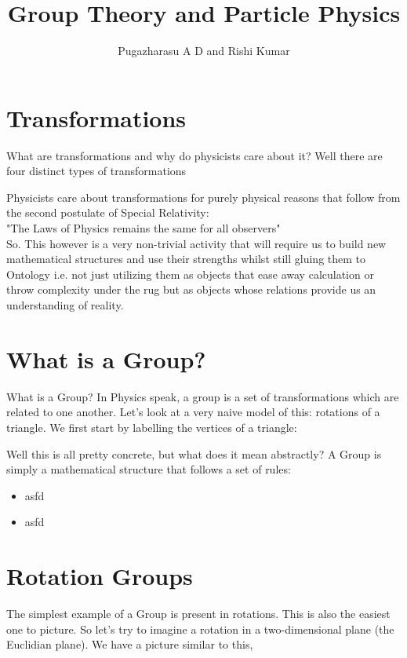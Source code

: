 \documentclass[]{article}
\title{Group Theory and Particle Physics}
\author{Pugazharasu A D and Rishi Kumar}
\begin{document}
\maketitle

\begin{abstract}

\end{abstract}
\section{Transformations}
What are transformations and why do physicists care about it? Well there are four distinct types of transformations

Physicists care about transformations for purely physical reasons that follow from the second postulate of Special Relativity:\\
"The Laws of Physics remains the same for all observers"\\
So. This however is a very non-trivial activity that will require us to build new mathematical structures and use their strengths whilst still gluing them to Ontology i.e. not just utilizing them as objects that ease away calculation or throw complexity under the rug but as objects whose relations provide us an understanding of reality.


\section{What is a Group?}
What is a Group? In Physics speak, a group is a set of transformations which are related to one another. Let's look at a very naive model of this: rotations of a triangle. We first start by labelling the vertices of a triangle:

Well this is all pretty concrete, but what does it mean abstractly? A Group is simply a mathematical structure that follows a set of rules:
\begin{itemize}
\item asfd
\item asfd
\end{itemize}

\section{Rotation Groups}
The simplest example of a Group is present in rotations. This is also the easiest one to picture. So let's try to imagine a rotation in a two-dimensional plane (the Euclidian plane). We have a picture similar to this,
\end{document}
